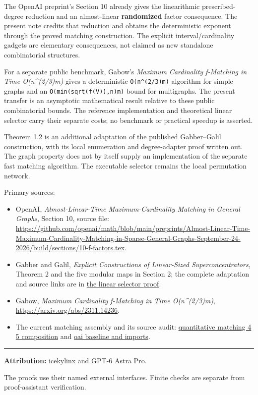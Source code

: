 The OpenAI preprint's Section 10 already gives the linearithmic prescribed-degree reduction and an almost-linear \textbf{randomized} factor consequence. The present note credits that reduction and obtains the deterministic exponent through the proved matching construction. The explicit interval/cardinality gadgets are elementary consequences, not claimed as new standalone combinatorial structures.

For a separate public benchmark, Gabow's \emph{Maximum Cardinality f-Matching in Time O(n\^{}(2/3)m)} gives a deterministic \texttt{O(n\^{}(2/3)m)} algorithm for simple graphs and an \texttt{O(min(sqrt(f(V)),n)m)} bound for multigraphs. The present transfer is an asymptotic mathematical result relative to these public combinatorial bounds. The reference implementation and theoretical linear selector carry their separate costs; no benchmark or practical speedup is asserted.

Theorem 1.2 is an additional adaptation of the published Gabber--Galil construction, with its local enumeration and degree-adapter proof written out. The graph property does not by itself supply an implementation of the separate fast matching algorithm. The executable selector remains the local permutation network.

Primary sources:

\begin{itemize}
\tightlist
\item
  OpenAI, \emph{Almost-Linear-Time Maximum-Cardinality Matching in General Graphs}, Section 10, source file: \url{https://github.com/openai/math/blob/main/preprints/Almost-Linear-Time-Maximum-Cardinality-Matching-in-Sparse-General-Graphs-September-24-2026/build/sections/10-f-factors.tex}.
\item
  Gabber and Galil, \emph{Explicit Constructions of Linear-Sized Superconcentrators}, Theorem 2 and the five modular maps in Section 2; the complete adaptation and source links are in \href{https://github.com/icekylinx/algorithm-frontier/blob/main/problems/degree-constrained-subgraphs/linear-selector.md}{the linear selector proof}.
\item
  Gabow, \emph{Maximum Cardinality f-Matching in Time O(n\^{}(2/3)m)}, \url{https://arxiv.org/abs/2311.14236}.
\item
  The current matching assembly and its source audit: \href{https://github.com/icekylinx/algorithm-frontier/blob/main/manuscripts/graph-backends/quantitative-matching-4-5-composition.md}{quantitative matching 4 5 composition} and \href{https://github.com/icekylinx/algorithm-frontier/blob/main/manuscripts/graph-backends/oai-baseline-and-imports.md}{oai baseline and imports}.
\end{itemize}

\begin{center}\rule{0.5\linewidth}{0.5pt}\end{center}

\textbf{Attribution:} icekylinx and GPT-6 Astra Pro.

The proofs use their named external interfaces. Finite checks are separate from proof-assistant verification.
